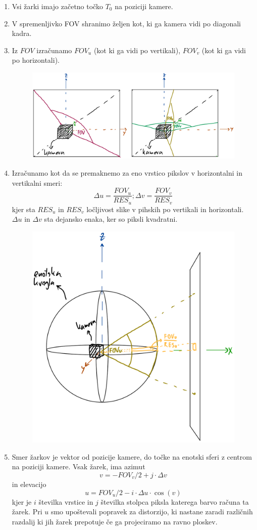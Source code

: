 \documentclass[titlepage]{article}
\begin{document}
\begin{enumerate}
  \item Vsi žarki imajo začetno točko \(T_{0}\) na poziciji kamere.
  \item V spremenljivko FOV shranimo željen kot, ki ga kamera vidi po diagonali kadra.
  \item Iz \( FOV \) izračunamo \( FOV_u \) (kot ki ga vidi po vertikali), \( FOV_v \) (kot ki ga vidi po horizontali).
  \begin{figure}[H]
    \centering
    \includegraphics[width=0.5\linewidth]{Images/fov_v_fovu_fovv.png}
    \label{Slika:fov_v_fovu_fovv}
  \end{figure}
  \item Izračunamo kot da se premaknemo za eno vrstico pikslov v horizontalni in vertikalni smeri:
  \[\Delta u = \frac{FOV_u}{RES_u};  \Delta v = \frac{FOV_v}{RES_v} \] 
  kjer sta \(RES_u\) in \(RES_v\) ločljivost slike v pihskih po vertikali in horizontali. 
  \( \Delta u \) in \( \Delta v \) sta dejansko enaka, ker so piksli kvadratni.
  \begin{figure}[H]
    \centering
    \includegraphics[width=0.25\linewidth]{Images/premik_fovu.png}
    \label{Slika:premik_fovu}
  \end{figure}
  \item Smer žarkov je vektor od pozicije kamere, do točke na enotski sferi z centrom na poziciji kamere. Vsak žarek, 
  ima azimut \[ v = -FOV_v/2 + j \cdot \Delta v \] in elevacijo \[ u = FOV_u/2 - i \cdot \Delta u \cdot \cos(v) \]
  kjer je \( i \) številka vrstice in \( j \) številka stolpca piksla katerega barvo računa ta žarek. \newline
  Pri \( u \) smo upoštevali popravek za distorzijo, ki nastane zaradi različnih razdalij ki jih žarek prepotuje
  če ga projeciramo na ravno ploskev.
  \begin{figure}[H]

\end{figure}
\end{enumerate}
\end{document}
